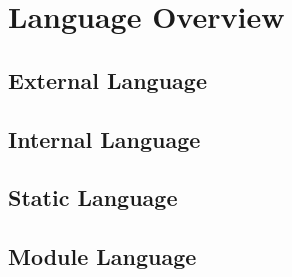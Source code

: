 
\chapter{Language Overview}
\section{External Language}
\section{Internal Language}
\section{Static Language}
\section{Module Language}

